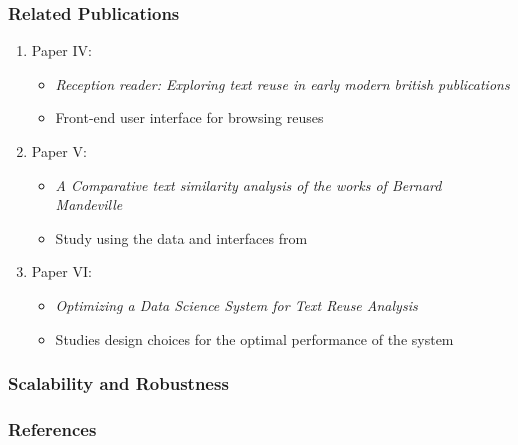 \documentclass[pdf]{beamer}
\begin{document}
\begin{frame}
    \frametitle{Related Publications}

    \begin{enumerate}
        \item Paper IV: \citet{Rosson-2023}
        \begin{itemize}
            \item \emph{Reception reader: Exploring text reuse in early modern british publications}
            \item Front-end user interface for browsing reuses
        \end{itemize}
        \item Paper V: \citet{des6}
        \begin{itemize}
            \item \emph{A Comparative text similarity analysis of the works of Bernard Mandeville}
            \item Study using the data and interfaces from \cite{Rosson-2023}
        \end{itemize}
        \item Paper VI: \citet{mahadevan2024optimizing}
        \begin{itemize}
            \item \emph{Optimizing a Data Science System for Text Reuse Analysis}
            \item Studies design choices for the optimal performance of the system
        \end{itemize}
    \end{enumerate}


\end{frame}
\begin{frame}
    \frametitle{Scalability and Robustness}
\end{frame}

\begin{frame}[allowframebreaks]
    \frametitle{References}
    
    
  \end{frame}
\end{document}
